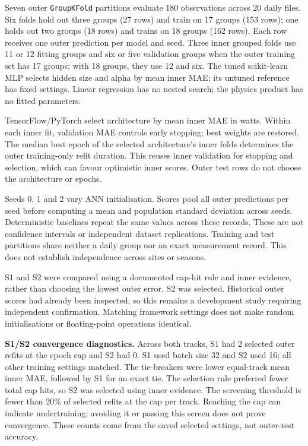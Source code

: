\documentclass[10pt,journal,twoside]{IEEEtran}
\begin{document}
Seven outer \texttt{GroupKFold} partitions evaluate 180 observations across 20 daily files. Six folds hold out three groups (27 rows) and train on 17 groups (153 rows); one holds out two groups (18 rows) and trains on 18 groups (162 rows). Each row receives one outer prediction per model and seed. Three inner grouped folds use 11 or 12 fitting groups and six or five validation groups when the outer training set has 17 groups; with 18 groups, they use 12 and six.
The tuned scikit-learn MLP selects hidden size and alpha by mean inner MAE; its untuned
reference has fixed settings. Linear regression has no nested search; the physics product
has no fitted parameters.

TensorFlow/PyTorch select architecture by mean inner MAE in watts. Within each inner fit,
validation MAE controls early stopping; best weights are restored. The median best epoch
of the selected architecture's inner folds determines the outer training-only refit duration.
This reuses inner validation for stopping and selection, which can favour optimistic inner
scores. Outer test rows do not choose the architecture or epochs.

Seeds 0, 1 and 2 vary ANN initialisation. Scores pool all outer predictions per seed before
computing a mean and population standard deviation across seeds. Deterministic baselines
repeat the same values across these records. These are not confidence intervals or
independent dataset replications. Training and test partitions share neither a daily group nor an exact measurement record. This does not establish independence across sites or seasons.

S1 and S2 were compared using a documented cap-hit rule and inner evidence, rather than choosing
the lowest outer error. S2 was selected. Historical outer scores had already been inspected,
so this remains a development study requiring independent confirmation. Matching framework
settings does not make random initialisations or floating-point operations identical.


\textbf{S1/S2 convergence diagnostics.} Across both tracks, S1 had 2 selected outer refits at the epoch cap and S2 had 0. S1 used batch size 32 and S2 used 16; all other training settings matched. The tie-breakers were lower equal-track mean inner MAE, followed by S1 for an exact tie. The selection rule preferred fewer total cap hits, so S2 was selected using inner evidence. The screening threshold is fewer than 20\% of selected refits at the cap per track. Reaching the cap can indicate undertraining; avoiding it or passing this screen does not prove convergence. These counts come from the saved selected settings, not outer-test accuracy.
\end{document}
